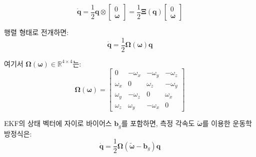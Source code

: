             \begin{equation}
                \dot{\mathbf{q}} = \frac{1}{2} \mathbf{q} \otimes \begin{bmatrix} 0 \\ \boldsymbol{\omega} \end{bmatrix} = \frac{1}{2} \boldsymbol{\Xi}(\mathbf{q}) \begin{bmatrix} 0 \\ \boldsymbol{\omega} \end{bmatrix}
                \label{eq:quat_kinematics_cont}
            \end{equation}

            행렬 형태로 전개하면:\\

            \begin{equation}
                \dot{\mathbf{q}} = \frac{1}{2} \boldsymbol{\Omega}(\boldsymbol{\omega}) \mathbf{q}
                \label{eq:quat_kinematics_omega}
            \end{equation}

            \noindent 여기서 $\boldsymbol{\Omega}(\boldsymbol{\omega}) \in \mathbb{R}^{4\times 4}$는:\\

            \begin{equation}
                \boldsymbol{\Omega}(\boldsymbol{\omega}) = \begin{bmatrix}
                    0       & -\omega_x & -\omega_y & -\omega_z \\
                    \omega_x &  0        &  \omega_z & -\omega_y \\
                    \omega_y & -\omega_z &  0        &  \omega_x \\
                    \omega_z &  \omega_y & -\omega_x &  0
                \end{bmatrix}
                \label{eq:omega_matrix}
            \end{equation}

            EKF의 상태 벡터에 자이로 바이어스 $\mathbf{b}_g$를 포함하면, 측정 각속도 $\tilde{\boldsymbol{\omega}}$를 이용한 운동학 방정식은:\\

            \begin{equation}
                \dot{\mathbf{q}} = \frac{1}{2} \boldsymbol{\Omega}(\tilde{\boldsymbol{\omega}} - \mathbf{b}_g) \mathbf{q}
                \label{eq:quat_kinematics_bias}
            \end{equation}

